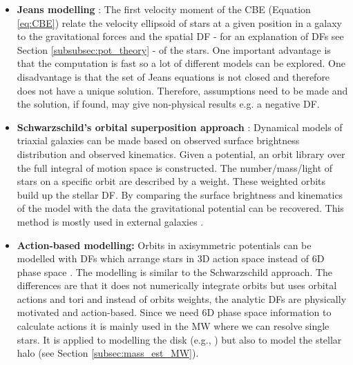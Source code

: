 \begin{itemize}
    \item \textbf{Jeans modelling} \citep{Jeans.....1915}: The first velocity moment of the \ac{CBE} (Equation \ref{eq:CBE}) relate the velocity ellipsoid of stars at a given position in a galaxy to the gravitational forces and the spatial \ac{DF} - for an explanation of \acp{DF} see Section \ref{subsubsec:pot_theory} - of the stars. One important advantage is that the computation is fast so a lot of different models can be explored. One disadvantage is that the set of Jeans equations is not closed and therefore does not have a unique solution. Therefore, assumptions need to be made and the solution, if found, may give non-physical results e.g. a negative \ac{DF}. 
    \item \textbf{Schwarzschild's orbital superposition approach} \citep{Schwarzschild...1979}: Dynamical models of triaxial galaxies can be made based on observed surface brightness distribution and observed kinematics. Given a potential, an orbit library over the full integral of motion space is constructed. The number/mass/light of stars on a specific orbit are described by a weight. These weighted orbits build up the stellar \ac{DF}. By comparing the surface brightness and kinematics of the model with the data the gravitational potential can be recovered. This method is mostly used in external galaxies \citep{Rix...Schwarzschild...1997, vdBosch...Schwarzschild...2008, Vasiliev...Schwarzschild...2013, Ling...Schwarzschild...2018}.
    \item \textbf{Action-based modelling:} Orbits in axisymmetric potentials can be modelled with \acp{DF} which arrange stars in 3D action space instead of 6D phase space \citep{Binney...actionbasedmodelling...2012, Bovy...actionbasedmodelling...2013}. The modelling is similar to the Schwarzschild approach. The differences are that it does not numerically integrate orbits but uses orbital actions and tori and instead of orbits weights, the analytic \acp{DF} are physically motivated and action-based. Since we need 6D phase space information to calculate actions it is mainly used in the \ac{MW} where we can resolve single stars. It is applied to modelling the disk (e.g., \citealp{trick...ROADMAPPING...2016, Wilmathesis}) but also to model the stellar halo (see Section \ref{subsec:mass_est_MW}). 
\end{itemize}
